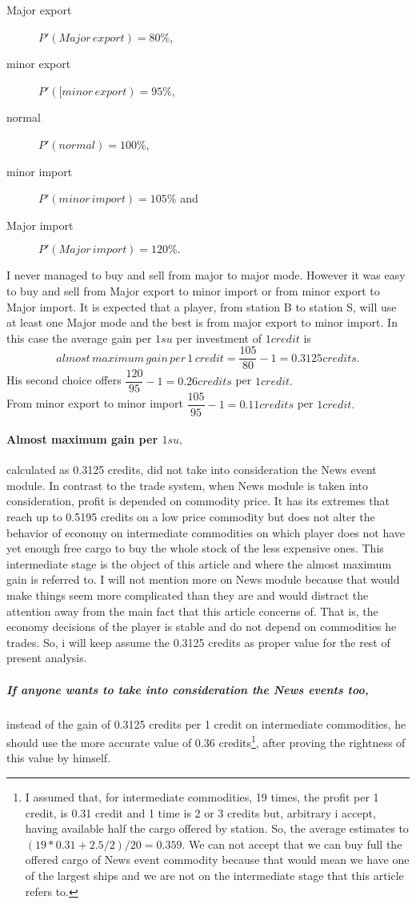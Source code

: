\documentclass[]{article}
\begin{document}
\begin{description}
	\item[Major export] $P'(Major\, export)=80\%$, 
	\item[minor export]  $P'([minor\, export)=95\%$, 
	\item[normal]  $P'(normal)=100\%$, 
	\item[minor import]  $P'(minor\, import)=105\%$ and 
	\item[Major import]  $P'(Major\, import)=120\%.$
\end{description} 
I never managed to buy and sell from major to major mode. However it was easy to buy and sell from Major export to minor import or from minor export to Major import. It is expected that a player, from station B to station S, will use at least one Major mode and the best is from major export to minor import. In this case the average gain per $1su$ per investment of $1credit$ is \begin{equation}\label{eq:maximum_gain_per_1su}
	almost\,maximum\,gain\,per\,1\,credit=\dfrac{105}{80}-1=0.3125credits.
\end{equation}  His second choice offers $\dfrac{120}{95}-1=0.26credits$ per $1credit.$\\
From minor export to minor import $\dfrac{105}{95}-1=0.11credits$ per $1credit.$
\paragraph{Almost maximum gain per $1su,$} calculated as 0.3125 credits, did not take into consideration the News event module. In contrast to the trade system,  when News module is taken into consideration, profit is depended on commodity price. It has its extremes that reach up to 0.5195 credits on a low price commodity but does not alter the behavior of economy on intermediate commodities on which player does not have yet enough free cargo to buy the whole stock of the less expensive ones. This intermediate stage is the object of this article and where the almost maximum gain is referred to. I will not mention more on News module because that would make things seem more complicated than they are and would distract the attention away from the main fact that this article concerns of. That is, the economy decisions of the player is stable and do not depend on commodities he trades. So, i will keep assume the 0.3125 credits as proper value for the rest of present analysis.
\subparagraph*{If anyone wants to take into consideration the News events too,} instead of the gain of 0.3125 credits  per 1 credit on intermediate commodities, he should use the more accurate value of 0.36 credits\footnote{I assumed that, for intermediate commodities, 19 times, the profit per 1 credit, is 0.31 credit and 1 time is 2 or 3 credits but, arbitrary i accept, having available half the cargo offered by station. So, the average estimates to $(19*0.31+2.5/2)/20=0.359.$ We can not accept that we can buy full the offered cargo of News event commodity because that would mean we have one of the largest ships and we are not on the intermediate stage that this article refers to.}, after proving the rightness of this value by himself. 
\end{document}
